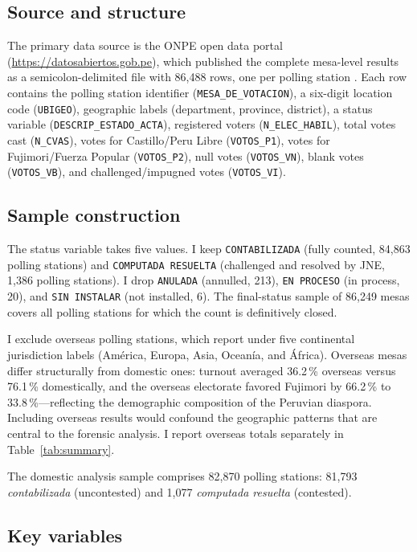 \documentclass[12pt]{article}
\begin{document}
\subsection{Source and structure}

The primary data source is the ONPE open data portal
(\url{https://datosabiertos.gob.pe}), which published the complete mesa-level
results as a semicolon-delimited file with 86,488 rows, one per polling station
\citep{onpe2021}. Each row contains the polling station identifier
(\texttt{MESA\_DE\_VOTACION}), a six-digit location code (\texttt{UBIGEO}),
geographic labels (department, province, district), a status variable
(\texttt{DESCRIP\_ESTADO\_ACTA}), registered voters (\texttt{N\_ELEC\_HABIL}),
total votes cast (\texttt{N\_CVAS}), votes for Castillo/Peru Libre
(\texttt{VOTOS\_P1}), votes for Fujimori/Fuerza Popular (\texttt{VOTOS\_P2}),
null votes (\texttt{VOTOS\_VN}), blank votes (\texttt{VOTOS\_VB}), and
challenged/impugned votes (\texttt{VOTOS\_VI}).

\subsection{Sample construction}

The status variable takes five values. I keep \texttt{CONTABILIZADA}
(fully counted, 84,863 polling stations) and \texttt{COMPUTADA RESUELTA}
(challenged and resolved by JNE, 1,386 polling stations). I drop
\texttt{ANULADA} (annulled, 213), \texttt{EN PROCESO} (in process, 20), and
\texttt{SIN INSTALAR} (not installed, 6). The final-status sample of
86,249 mesas covers all polling stations for which the count is definitively
closed.

I exclude overseas polling stations, which report under five continental
jurisdiction labels (Am\'erica, Europa, Asia, Ocean\'ia, and \'Africa).
Overseas mesas differ structurally from domestic ones: turnout averaged
36.2\,\% overseas versus 76.1\,\% domestically, and the overseas electorate
favored Fujimori by 66.2\,\% to 33.8\,\%---reflecting the demographic
composition of the Peruvian diaspora. Including overseas results would confound
the geographic patterns that are central to the forensic analysis. I report
overseas totals separately in Table~\ref{tab:summary}.

The domestic analysis sample comprises 82,870 polling stations: 81,793
\emph{contabilizada} (uncontested) and 1,077 \emph{computada resuelta}
(contested).

\subsection{Key variables}
\end{document}
